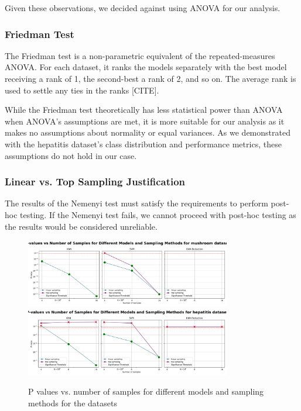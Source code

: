 Given these observations, we decided against using ANOVA for our analysis.

\subsubsection{Friedman Test}
The Friedman test is a non-parametric equivalent of the repeated-measures ANOVA. 
For each dataset, it ranks the models separately with the best model receiving a rank of 1, the second-best a rank of 2, and so on.
The average rank is used to settle any ties in the ranks [CITE].

While the Friedman test theoretically has less statistical power than ANOVA when ANOVA's assumptions are met,
it is more suitable for our analysis as it makes no assumptions about normality or equal variances.
As we demonstrated with the hepatitis dataset's class distribution and performance metrics, these assumptions do not hold in our case.

\subsubsection{Linear vs. Top Sampling Justification}
The results of the Nemenyi test must satisfy the requirements to perform post-hoc testing.
If the Nemenyi test fails, we cannot proceed with post-hoc testing as the results would be considered unreliable.

\begin{figure}[!ht]
    \centering
    \includegraphics[width=0.8\textwidth]{figures/p_values_vs_num_samples_mushroom.png}
    \includegraphics[width=0.8\textwidth]{figures/p_values_vs_num_samples_hepatitis.png}
    \caption{P values vs. number of samples for different models and sampling methods for the datasets}
\label{fig:p-values-vs-num-samples}
\end{figure}


